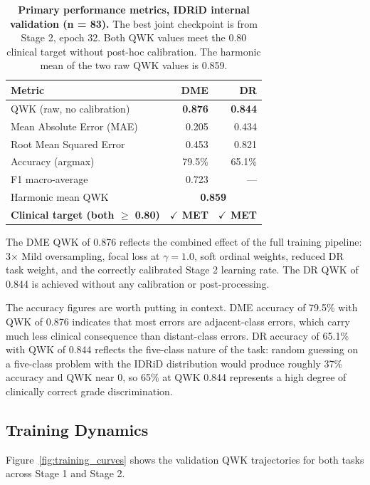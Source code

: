 \documentclass[12pt,a4paper]{article}
\begin{document}
\begin{table}[H]
\centering
\small
\caption{\textbf{Primary performance metrics, IDRiD internal validation (n = 83).} The best joint checkpoint is from Stage 2, epoch 32. Both QWK values meet the 0.80 clinical target without post-hoc calibration. The harmonic mean of the two raw QWK values is 0.859.}
\label{tab:main_results}
\begin{tabular}{|l|r|r|}
\hline
\textbf{Metric} & \textbf{DME} & \textbf{DR} \\
\hline
QWK (raw, no calibration) & \textbf{0.876} & \textbf{0.844} \\
Mean Absolute Error (MAE) & 0.205 & 0.434 \\
Root Mean Squared Error & 0.453 & 0.821 \\
Accuracy (argmax) & 79.5\% & 65.1\% \\
F1 macro-average & 0.723 & --- \\
Harmonic mean QWK & \multicolumn{2}{c|}{\textbf{0.859}} \\
\hline
\textbf{Clinical target (both $\geq$ 0.80)} & \textbf{$\checkmark$ MET} & \textbf{$\checkmark$ MET} \\
\hline
\end{tabular}
\end{table}

The DME QWK of 0.876 reflects the combined effect of the full training pipeline: 3$\times$ Mild oversampling, focal loss at $\gamma = 1.0$, soft ordinal weights, reduced DR task weight, and the correctly calibrated Stage 2 learning rate. The DR QWK of 0.844 is achieved without any calibration or post-processing.

The accuracy figures are worth putting in context. DME accuracy of 79.5\% with QWK of 0.876 indicates that most errors are adjacent-class errors, which carry much less clinical consequence than distant-class errors. DR accuracy of 65.1\% with QWK of 0.844 reflects the five-class nature of the task: random guessing on a five-class problem with the IDRiD distribution would produce roughly 37\% accuracy and QWK near 0, so 65\% at QWK 0.844 represents a high degree of clinically correct grade discrimination.
\newpage
\subsection{Training Dynamics}

Figure~\ref{fig:training_curves} shows the validation QWK trajectories for both tasks across Stage 1 and Stage 2.
\end{document}
